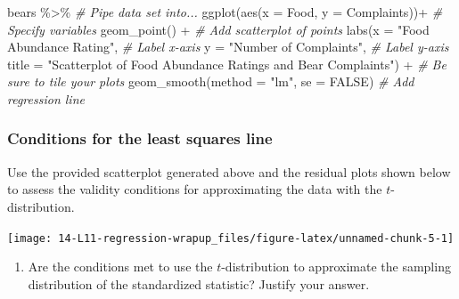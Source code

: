 \documentclass[
]{report}
\newenvironment{Shaded}{\begin{snugshade}}{\end{snugshade}}
\newcommand{\AttributeTok}[1]{\textcolor[rgb]{0.77,0.63,0.00}{#1}}
\newcommand{\CommentTok}[1]{\textcolor[rgb]{0.56,0.35,0.01}{\textit{#1}}}
\newcommand{\ConstantTok}[1]{\textcolor[rgb]{0.00,0.00,0.00}{#1}}
\newcommand{\FunctionTok}[1]{\textcolor[rgb]{0.00,0.00,0.00}{#1}}
\newcommand{\NormalTok}[1]{#1}
\newcommand{\SpecialCharTok}[1]{\textcolor[rgb]{0.00,0.00,0.00}{#1}}
\newcommand{\StringTok}[1]{\textcolor[rgb]{0.31,0.60,0.02}{#1}}
\providecommand{\tightlist}{%
  \setlength{\itemsep}{0pt}\setlength{\parskip}{0pt}}
\begin{document}
\begin{Shaded}
\begin{Highlighting}[]
\NormalTok{bears }\SpecialCharTok{\%\textgreater{}\%} \CommentTok{\# Pipe data set into...}
\FunctionTok{ggplot}\NormalTok{(}\FunctionTok{aes}\NormalTok{(}\AttributeTok{x =}\NormalTok{ Food, }\AttributeTok{y =}\NormalTok{ Complaints))}\SpecialCharTok{+}  \CommentTok{\# Specify variables}
  \FunctionTok{geom\_point}\NormalTok{() }\SpecialCharTok{+}  \CommentTok{\# Add scatterplot of points}
  \FunctionTok{labs}\NormalTok{(}\AttributeTok{x =} \StringTok{"Food Abundance Rating"}\NormalTok{,  }\CommentTok{\# Label x{-}axis}
       \AttributeTok{y =} \StringTok{"Number of Complaints"}\NormalTok{,  }\CommentTok{\# Label y{-}axis}
       \AttributeTok{title =} \StringTok{"Scatterplot of Food Abundance Ratings and Bear Complaints"}\NormalTok{) }\SpecialCharTok{+} 
               \CommentTok{\# Be sure to tile your plots}
  \FunctionTok{geom\_smooth}\NormalTok{(}\AttributeTok{method =} \StringTok{"lm"}\NormalTok{, }\AttributeTok{se =} \ConstantTok{FALSE}\NormalTok{)  }\CommentTok{\# Add regression line}
\end{Highlighting}
\end{Shaded}

\hypertarget{conditions-for-the-least-squares-line-1}{%
\subsubsection*{Conditions for the least squares line}\label{conditions-for-the-least-squares-line-1}}

Use the provided scatterplot generated above and the residual plots shown below to assess the validity conditions for approximating the data with the \(t\)-distribution.

\begin{center}\texttt{[image: 14-L11-regression-wrapup\_files/figure-latex/unnamed-chunk-5-1]} \end{center}

\begin{enumerate}
\def\labelenumi{\arabic{enumi}.}
\setcounter{enumi}{5}
\tightlist
\item
  Are the conditions met to use the \(t\)-distribution to approximate the sampling distribution of the standardized statistic? Justify your answer.
\end{enumerate}

\vspace{1.5in}
\end{document}
